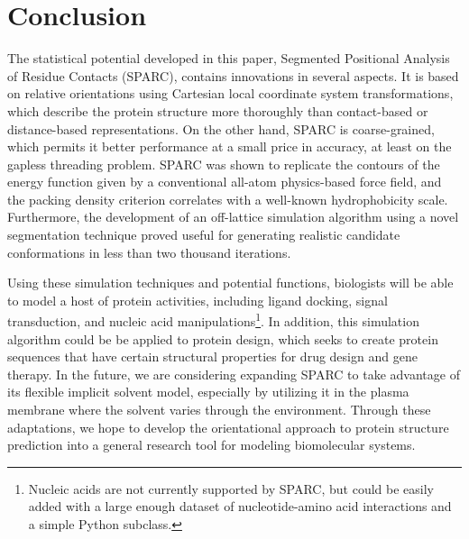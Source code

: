 \documentclass[11pt,titlepage]{article}
\begin{document}
\section{Conclusion}
The statistical potential developed in this paper, Segmented Positional Analysis of Residue Contacts (SPARC), contains innovations in several aspects. 
It is based on relative orientations using Cartesian local coordinate system transformations, which describe the protein structure more thoroughly than contact-based or distance-based representations.
On the other hand, SPARC is coarse-grained, which permits it better performance at a small price in accuracy, at least on the gapless threading problem.
SPARC was shown to replicate the contours of the energy function given by a conventional all-atom physics-based force field, and the packing density criterion correlates with a well-known hydrophobicity scale.
Furthermore, the development of an off-lattice simulation algorithm using a novel segmentation technique proved useful for generating realistic candidate conformations in less than two thousand iterations.

Using these simulation techniques and potential functions, biologists will be able to model a host of protein activities, including ligand docking, signal transduction, and nucleic acid manipulations\footnote{Nucleic acids are not currently supported by SPARC, but could be easily added with a large enough dataset of nucleotide-amino acid interactions and a simple Python subclass.}.
In addition, this simulation algorithm could be be applied to protein design, which seeks to create protein sequences that have certain structural properties for drug design and gene therapy.
In the future, we are considering expanding SPARC to take advantage of its flexible implicit solvent model, especially by utilizing it in the plasma membrane where the solvent varies through the environment.
Through these adaptations, we hope to develop the orientational approach to protein structure prediction into a general research tool for modeling biomolecular systems.


{\footnotesize }
\end{document}
